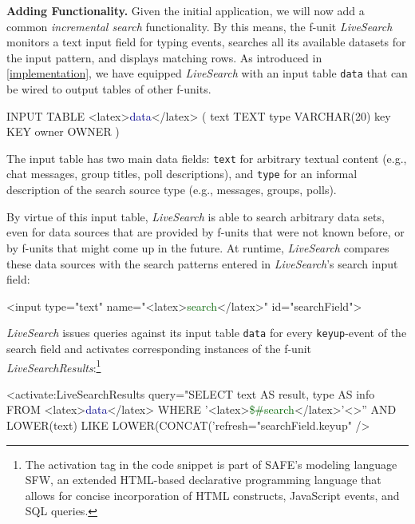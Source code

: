 \documentclass{src/acm_proc_article-sp} \else
\newcommand\myparagraph[1]{\medskip\noindent\textbf{#1.}}
\newcommand\SAFE{SAFE\xspace}
\begin{document}
\myparagraph{Adding Functionality}
Given the initial application, we will now add a common
\emph{incremental search} functionality. By this means, the f-unit
\emph{LiveSearch} monitors a text input field for typing events,
searches all its available datasets for the input pattern, and
displays matching rows. As introduced in \autoref{implementation}, we
have equipped \emph{LiveSearch} with an input table \texttt{data}
that can be wired to output tables of other f-units. 
\begin{lsthere}
    INPUT TABLE <latex>\textcolor{darkblue}{data}\!</latex> ( text  TEXT
                      type  VARCHAR(20)
                      key   KEY
                      owner OWNER )
\end{lsthere}
The input table
has two main data fields: \texttt{text} for arbitrary textual content
(e.g., chat messages, group titles, poll descriptions), and
\texttt{type} for an informal description of the search source type
(e.g., messages, groups, polls).

By virtue of this input table, \emph{LiveSearch} is able to search
arbitrary data sets, even for data sources that are provided by
f-units that were not known before, or by f-units that might come up
in the future. At runtime, \emph{LiveSearch} compares these data
sources with the search patterns entered in \emph{LiveSearch}'s
search input field:
\begin{lsthere}
    <input type="text" name="<latex>\textcolor{darkgreen}{search}</latex>" id="searchField">
\end{lsthere}
\emph{LiveSearch} issues queries against its input table
\texttt{data} for every \texttt{keyup}-event of the search field and
activates corresponding instances of the f-unit
\emph{LiveSearchResults}:\footnote{The activation tag in the code
snippet is part of \SAFE's modeling language SFW, an extended
HTML-based declarative programming language that allows for concise
incorporation of HTML constructs, JavaScript events, and SQL queries.}

\begin{lsthere}
    <activate:LiveSearchResults
     query="SELECT text AS result, type AS info
            FROM <latex>\textcolor{darkblue}{data}</latex>
            WHERE '<latex>\textcolor{darkgreen}{\$\#search}</latex>'<>'' AND
              LOWER(text) LIKE LOWER(CONCAT('refresh="searchField.keyup" />
\end{lsthere}
\end{document}
